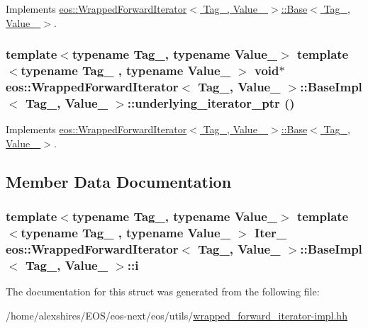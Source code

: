 Implements \hyperlink{structeos_1_1WrappedForwardIterator_1_1Base_a788fdefd6b028b601e7e56c367a5f864}{eos::WrappedForwardIterator$<$ Tag\_\-, Value\_\- $>$::Base$<$ Tag\_\-, Value\_\- $>$}.\hypertarget{structeos_1_1WrappedForwardIterator_1_1BaseImpl_aab9c324066b8488f0f84395de5b02dfc}{
\subsubsection[{underlying\_\-iterator\_\-ptr}]{\setlength{\rightskip}{0pt plus 5cm}template$<$typename Tag\_\-, typename Value\_\-$>$ template$<$typename Tag\_\- , typename Value\_\- $>$ void$\ast$ {\bf eos::WrappedForwardIterator}$<$ Tag\_\-, Value\_\- $>$::{\bf BaseImpl}$<$ Tag\_\-, Value\_\- $>$::underlying\_\-iterator\_\-ptr ()}}
\label{structeos_1_1WrappedForwardIterator_1_1BaseImpl_aab9c324066b8488f0f84395de5b02dfc}


Implements \hyperlink{structeos_1_1WrappedForwardIterator_1_1Base_a6f51dc38ebf16d338c4d14421a3a98e1}{eos::WrappedForwardIterator$<$ Tag\_\-, Value\_\- $>$::Base$<$ Tag\_\-, Value\_\- $>$}.

\subsection{Member Data Documentation}
\hypertarget{structeos_1_1WrappedForwardIterator_1_1BaseImpl_a1cb305ebb3b36e941fc5f74b78e4b8a1}{
\subsubsection[{i}]{\setlength{\rightskip}{0pt plus 5cm}template$<$typename Tag\_\-, typename Value\_\-$>$ template$<$typename Tag\_\- , typename Value\_\- $>$ Iter\_\- {\bf eos::WrappedForwardIterator}$<$ Tag\_\-, Value\_\- $>$::{\bf BaseImpl}$<$ Tag\_\-, Value\_\- $>$::{\bf i}}}
\label{structeos_1_1WrappedForwardIterator_1_1BaseImpl_a1cb305ebb3b36e941fc5f74b78e4b8a1}


The documentation for this struct was generated from the following file:\begin{DoxyCompactItemize}
\item 
/home/alexshires/EOS/eos-\/next/eos/utils/\hyperlink{wrapped__forward__iterator-impl_8hh}{wrapped\_\-forward\_\-iterator-\/impl.hh}\end{DoxyCompactItemize}
